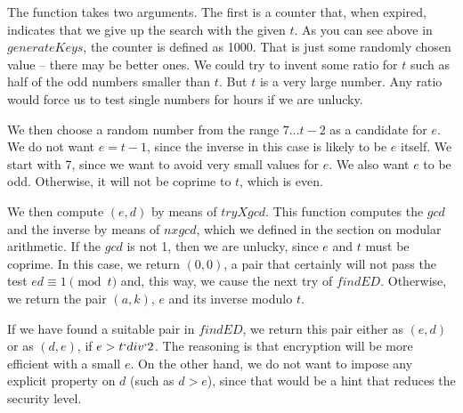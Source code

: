 \documentclass{scrreprt}
\makeatletter
\newcommand{\Varid}[1]{\mathit{#1}}
\newcommand{\anonymous}{\kern0.06em \vbox{\hrule\@width.5em}}
\def\resethooks{%
  \global\let\SaveRestoreHook\empty
  \global\let\ColumnHook\empty}
\newcommand{\hsindent}[1]{\quad}%
\makeatother
\begin{document}
\begin{minipage}{\textwidth}
\)\par\noindent\endgroup\resethooks
\end{minipage}

The function takes two arguments.
The first is a counter that, when expired,
indicates that we give up the search 
with the given $t$.
As you can see above in \ensuremath{\Varid{generateKeys}},
the counter is defined as 1000.
That is just some randomly chosen value --
there may be better ones.
We could try to invent some ratio for $t$
such as half of the odd numbers smaller than $t$.
But $t$ is a very large number.
Any ratio would force us to test single
numbers for hours if we are unlucky.

We then choose a random number 
from the range $7\dots t-2$ as a candidate for $e$.
We do not want $e=t-1$, since the inverse 
in this case is likely to be $e$ itself.
We start with 7, since we want to avoid
very small values for $e$.
We also want $e$ to be odd.
Otherwise, it will not be coprime to $t$,
which is even. 

We then compute $(e,d)$ by means of \ensuremath{\Varid{tryXgcd}}.
This function computes the \ensuremath{\Varid{gcd}} and the inverse
by means of \ensuremath{\Varid{nxgcd}},
which we defined in the section on modular arithmetic.
If the \ensuremath{\Varid{gcd}} is not 1, then we are unlucky,
since $e$ and $t$ must be coprime.
In this case, we return \ensuremath{(\mathrm{0},\mathrm{0})}, a pair that
certainly will not pass the test 
$ed \equiv 1 \pmod{t}$
and, this way, we cause the next try of \ensuremath{\Varid{findED}}.
Otherwise, we return the pair $(a,k)$,
$e$ and its inverse modulo $t$.

If we have found a suitable pair in \ensuremath{\Varid{findED}},
we return this pair either as $(e,d)$ or as $(d,e)$,
if $e > t `div` 2$.
The reasoning is that encryption will be more efficient
with a small $e$.
On the other hand, we do not want to impose any
explicit property on $d$ (such as $d > e$),
since that would be a hint that reduces the security level.
\end{document}
